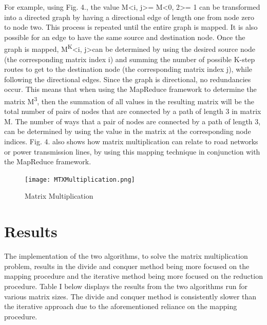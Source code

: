 \documentclass[conference]{IEEEtran}
\begin{document}
\medskip
\noindent For example, using Fig. 4., the value M\textless i, j\textgreater = M\textless 0, 2\textgreater = 1 can be transformed into a directed graph by having a directional edge of length one from node zero to node two. This process is repeated until the entire graph is mapped. It is also possible for an edge to have the same source and destination node.
Once the graph is mapped, M\textsuperscript{K}\textless i, j\textgreater can be determined by using the desired source node (the corresponding matrix index i) and summing the number of possible K-step routes to get to the destination node (the corresponding matrix index j), while following the directional edges. Since the graph is directional, no redundancies occur. This means that when using the MapReduce framework to determine the matrix M\textsuperscript{3}, then the summation of all values in the resulting matrix will be the total number of pairs of nodes that are connected by a path of length 3 in matrix M. The number of ways that a pair of nodes are connected by a path of length 3, can be determined by using the value in the matrix at the corresponding node indices. Fig. 4. also shows how matrix multiplication can relate to road networks or power transmission lines, by using this mapping technique in conjunction with the MapReduce framework.
  
\noindent
\begin{figure}[H]
\centering
\texttt{[image: MTXMultiplication.png]}
\caption{Matrix Multiplication}
\label{fig:circuit}
\end{figure}



\section{Results}
\noindent The implementation of the two algorithms, to solve the matrix multiplication problem, results in the divide and conquer method being more focused on the mapping procedure and the iterative method being more focused on the reduction procedure. Table I below displays the results from the  two algorithms run for various matrix sizes. The divide and conquer method is consistently slower than the iterative approach due to the aforementioned reliance on the mapping procedure. 
\end{document}
